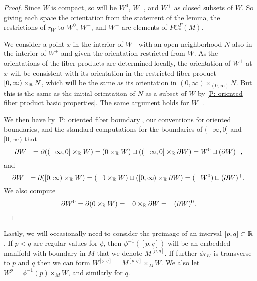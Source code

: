 \begin{proof}
	Since $W$ is compact, so will be $W^0$, $W^-$, and $W^+$ as closed subsets of $W$.
	So giving each space the orientation from the statement of the lemma, the restrictions of $r_W$ to $W^0$, $W^-$, and $W^+$ are elements of $PC_*^\Gamma(M)$.

	We consider a point $x$ in the interior of $W^+$ with an open neighborhood $N$ also in the interior of $W^+$ and given the orientation restricted from $W$.
	As the orientations of the fiber products are determined locally, the orientation of $W^+$ at $x$ will be consistent with its orientation in the restricted fiber product $[0,\infty) \times_{\mathbb{R}} N$, which will be the same as its orientation in $(0,\infty) \times_{(0,\infty)} N$.
	But this is the same as the initial orientation of $N$ as a subset of $W$ by \cref{P: oriented fiber product basic properties}.
	The same argument holds for $W^-$.

	We then have by \cref{P: oriented fiber boundary}, our conventions for oriented boundaries, and the standard computations for the boundaries of $(-\infty,0]$ and $[0,\infty)$ that
	\begin{equation*}
		\partial W^- = \partial ((-\infty,0] \times_{\mathbb{R}} W) = (0 \times_{\mathbb{R}} W) \sqcup ((-\infty,0] \times_{\mathbb{R}} \partial W) = W^0 \sqcup (\partial W)^-,
	\end{equation*}
	and
	\begin{equation*}
		\partial W^+ = \partial ([0,\infty) \times_{\mathbb{R}} W) = (-0 \times_{\mathbb{R}} W) \sqcup ([0,\infty) \times_{\mathbb{R}} \partial W) = (-W^0) \sqcup (\partial W)^+.
	\end{equation*}
	We also compute
	\begin{equation*}
		\partial W^0 = \partial (0 \times_{\mathbb{R}} W) = - 0 \times_{\mathbb{R}} \partial W = -(\partial W)^0.\qedhere
	\end{equation*}
\end{proof}

Lastly, we will occasionally need to consider the preimage of an interval $[p,q] \subset \mathbb{R}$.
If $p < q$ are regular values for $\phi$, then $\phi^{-1}([p,q])$ will be an embedded manifold with boundary in $M$ that we denote $M^{[p,q]}$.
If further $\phi r_W$ is transverse to $p$ and $q$ then we can form $W^{[p,q]} = M^{[p,q]} \times_M W$.
We also let $W^p = \phi^{-1}(p) \times_M W$, and similarly for $q$.

